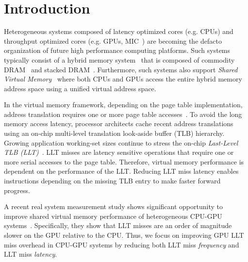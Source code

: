 
\section{Introduction}

\noindent Heterogeneous systems composed of latency optimized cores
(e.g. CPUs) and throughput optimized cores (e.g. GPUs, MIC~\cite{MIC})
are becoming the defacto organization of future high performance
computing platforms. Such systems typically consist of a hybrid memory
system~\cite{hbm_intel,hbm_amd,hbm_nvidia} that is composed of
commodity DRAM~\cite{ddr4-spec} and stacked
DRAM~\cite{hbm-spec,hmc_spec}. Furthermore, such systems also support
{\em Shared Virtual Memory}~\cite{HSA,UVM} where both CPUs and GPUs
access the entire hybrid memory address space using a unified virtual
address space.

In the virtual memory framework, depending on the page table
implementation, address translation requires one or more page table
accesses~\cite{Bhargava2008}. To avoid the long memory access latency,
processor architects cache recent address translations using an
on-chip multi-level translation look-aside buffer (TLB) hierarchy.
Growing application working-set sizes continue to stress the on-chip
{\em Last-Level TLB (LLT)}~\cite{spectlb, Basu2013, SharedLLT, COLT}.
LLT misses are latency sensitive operations that require one or more
serial accesses to the page table. Therefore, virtual memory
performance is dependent on the performance of the LLT. Reducing LLT
miss latency enables instructions depending on the missing TLB entry
to make faster forward progress.

A recent real system measurement study shows significant opportunity
to improve shared virtual memory performance of heterogeneous CPU-GPU
systems~\cite{vesley2016ispass}. Specifically, they show that LLT
misses are an order of magnitude slower on the GPU relative to the
CPU. Thus, we focus on improving GPU LLT miss overhead in CPU-GPU
systems by reducing both LLT miss {\em frequency} and LLT miss {\em
latency}.



